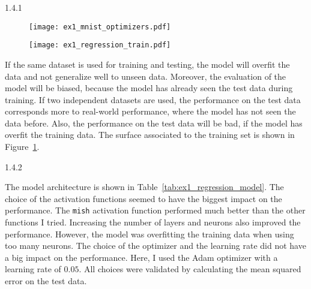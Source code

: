 \begin{task}{1.4.1}
\end{task}

\begin{figure}[ht!]
  \centering
  \begin{minipage}{0.48\textwidth}
    \centering
    \texttt{[image: ex1\_mnist\_optimizers.pdf]}
    \label{fig:ex1_mnist_optimizers}
  \end{minipage}
  \begin{minipage}{0.48\textwidth}
    \centering
    \texttt{[image: ex1\_regression\_train.pdf]}
    \label{fig:ex1_regression_train}
  \end{minipage}
\end{figure}

If the same dataset is used for training and testing, the model will overfit the data and not
generalize well to unseen data. Moreover, the evaluation of the model will be biased, because the
model has already seen the test data during training. If two independent datasets are used, the
performance on the test data corresponds more to real-world performance, where the model has not
seen the data before. Also, the performance on the test data will be bad, if the model has overfit
the training data. The surface associated to the training set is shown in
Figure~\ref{fig:ex1_regression_train}.


\begin{task}{1.4.2}
\end{task}

The model architecture is shown in Table~\ref{tab:ex1_regression_model}. The choice of the
activation functions seemed to have the biggest impact on the performance. The \texttt{mish}
activation function performed much better than the other functions I tried. Increasing the number of
layers and neurons also improved the performance. However, the model was overfitting the training
data when using too many neurons. The choice of the optimizer and the learning rate did not have a
big impact on the performance. Here, I used the Adam optimizer with a learning rate of $0.05$. All
choices were validated by calculating the mean squared error on the test data.

